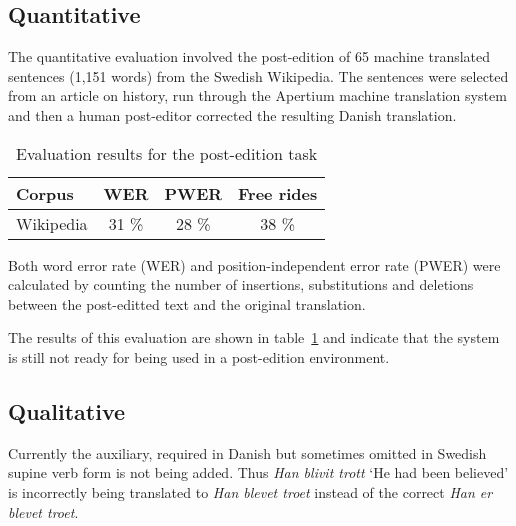 \documentclass[11pt]{article}
\begin{document}
\subsection{Quantitative}

The quantitative evaluation involved the post-edition of 65 machine translated
sentences (1,151 words) from the Swedish Wikipedia. The sentences were selected from an 
article on history, run through the Apertium machine translation system and then a human
post-editor corrected the resulting Danish translation.

\begin{table}
\centering
\begin{tabular}{|l|c|c|c|}
\hline
Corpus    & WER & PWER & Free rides\\
\hline
Wikipedia & 31 \% & 28 \%  & 38 \% \\
\hline
\end{tabular}
    \caption{Evaluation results for the post-edition task}
    \label{table:quanteval}
\end{table}

Both word error rate (WER) and position-independent error rate (PWER) were 
calculated by counting the number of insertions, substitutions and deletions
between the post-editted text and the original translation.

The results of this evaluation are shown in table~\ref{table:quanteval} and 
indicate that the system is still not ready for being used in a post-edition 
environment.

\subsection{Qualitative}


Currently the auxiliary, required in Danish but sometimes omitted in Swedish supine 
verb form is not being added. Thus \emph{Han blivit trott} `He had been believed' 
is incorrectly being translated to \emph{Han blevet troet} instead of the 
correct \emph{Han er blevet troet}.
\end{document}
